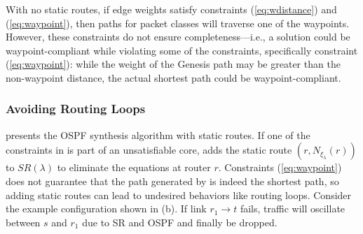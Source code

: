 With no static routes, if edge weights satisfy 
constraints (\ref{eq:wdistance}) and (\ref{eq:waypoint}), 
then paths for packet classes will traverse one of the waypoints. However, these
constraints do not ensure completeness---i.e., a solution could be waypoint-compliant
while violating some of the constraints, specifically constraint (\ref{eq:waypoint}):
while the weight of the Genesis path may be greater than the non-waypoint distance, 
the actual shortest path could be waypoint-compliant.


\subsubsection{Avoiding Routing Loops} \label{sec:loopavoidance} \hspace*{4mm}


 presents the OSPF 
synthesis algorithm with static routes.  
If one of the constraints in  is part of an unsatisfiable  
core, \name adds the static 
route
 $(r, N_{\xi_\lambda}(r))$ to
$SR(\lambda)$ to eliminate the equations at router $r$. 
Constraints (\ref{eq:waypoint}) does not 
guarantee that the path generated
by \genesis is indeed the shortest path, so adding
static routes can lead to undesired behaviors like routing loops.  
Consider the example configuration shown in (b).
If link $r_1 \rightarrow t$ fails, traffic will oscillate between 
$s$ and $r_1$ due to SR and OSPF and finally be dropped. 

